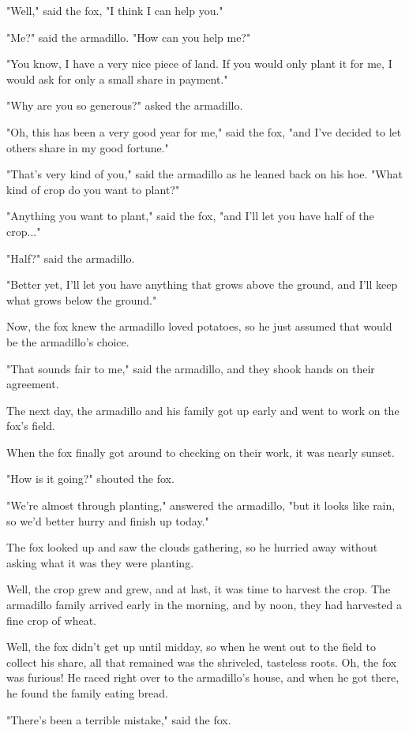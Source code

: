 "Well," said the fox, "I think I can help you."

"Me?" said the armadillo. "How can you help me?"

"You know, I have a very nice piece of land. If you would only plant it for me, I would ask for only a small share in payment."

"Why are you so generous?" asked the armadillo.

"Oh, this has been a very good year for me," said the fox, "and I've decided to let others share in my good fortune."

"That's very kind of you," said the armadillo as he leaned back on his hoe. "What kind of crop do you want to plant?"

"Anything you want to plant," said the fox, "and I'll let you have half of the crop..."

"Half?" said the armadillo.

"Better yet, I'll let you have anything that grows above the ground, and I'll keep what grows below the ground."

Now, the fox knew the armadillo loved potatoes, so he just assumed that would be the armadillo's choice.

"That sounds fair to me," said the armadillo, and they shook hands on their agreement.

The next day, the armadillo and his family got up early and went to work on the fox's field.

When the fox finally got around to checking on their work, it was nearly sunset.

"How is it going?" shouted the fox.

"We're almost through planting," answered the armadillo, "but it looks like rain, so we'd better hurry and finish up today."

The fox looked up and saw the clouds gathering, so he hurried away without asking what it was they were planting.

Well, the crop grew and grew, and at last, it was time to harvest the crop. The armadillo family arrived early in the morning, and by noon, they had harvested a fine crop of wheat.

Well, the fox didn't get up until midday, so when he went out to the field to collect his share, all that remained was the shriveled, tasteless roots. Oh, the fox was furious! He raced right over to the armadillo's house, and when he got there, he found the family eating bread.

"There's been a terrible mistake," said the fox.

